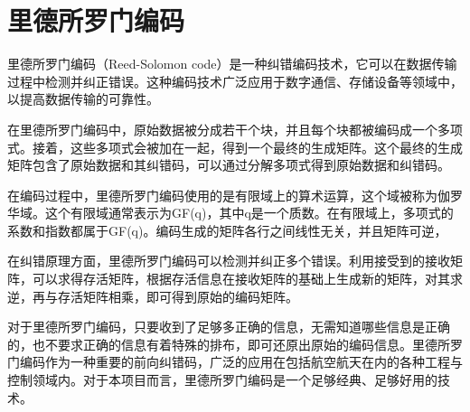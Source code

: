 \section{里德所罗门编码}

里德所罗门编码（Reed-Solomon code）是一种纠错编码技术，它可以在数据传输过程中检测并纠正错误。这种编码技术广泛应用于数字通信、存储设备等领域中，以提高数据传输的可靠性。

在里德所罗门编码中，原始数据被分成若干个块，并且每个块都被编码成一个多项式。接着，这些多项式会被加在一起，得到一个最终的生成矩阵。这个最终的生成矩阵包含了原始数据和其纠错码，可以通过分解多项式得到原始数据和纠错码。

在编码过程中，里德所罗门编码使用的是有限域上的算术运算，这个域被称为伽罗华域。这个有限域通常表示为GF(q)，其中q是一个质数。在有限域上，多项式的系数和指数都属于GF(q)。编码生成的矩阵各行之间线性无关，并且矩阵可逆，

在纠错原理方面，里德所罗门编码可以检测并纠正多个错误。利用接受到的接收矩阵，可以求得存活矩阵，根据存活信息在接收矩阵的基础上生成新的矩阵，对其求逆，再与存活矩阵相乘，即可得到原始的编码矩阵。

对于里德所罗门编码，只要收到了足够多正确的信息，无需知道哪些信息是正确的，也不要求正确的信息有着特殊的排布，即可还原出原始的编码信息。里德所罗门编码作为一种重要的前向纠错码，广泛的应用在包括航空航天在内的各种工程与控制领域内。对于本项目而言，里德所罗门编码是一个足够经典、足够好用的技术。